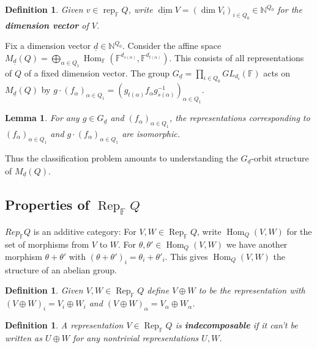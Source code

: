 \documentclass{book}
\newtheorem{lemma}[theorem]{Lemma}
\newtheorem{definition}[theorem]{Definition}
\DeclareMathOperator{\Hom}{Hom}
\DeclareMathOperator{\Rep}{Rep}
\DeclareMathOperator{\rep}{rep}
\begin{document}
	\begin{definition}
		Given $v\in \rep_\mathbb{F}Q$, write $\underline{\dim} V = (\dim V_i)_{i\in Q_0}\in \mathbb{N}^{Q_0}$ for the \textbf{dimension vector} of $V$.
	\end{definition}
	
	Fix a dimension vector $\underline{d} \in \mathbb{N}^{Q_0}$. Consider the affine space $M_{\underline{d}}(Q)=\bigoplus_{\alpha\in Q_1} \Hom_{\mathbb{F}}\left(\mathbb{F}^{d_{s(\alpha)}},\mathbb{F}^{d_{t(\alpha)}}\right)$. This consists of all representations of $Q$ of a fixed dimension vector. The group $G_{\underline{d}}= \prod_{i\in Q_0} GL_{d_i}(\mathbb{F})$ acts on $M_{\underline{d}}(Q)$ by $g\cdot (f_\alpha)_{\alpha\in Q_1}=\left(g_{t(\alpha)}f_\alpha g_{s(\alpha)}^{-1}\right)_{\alpha\in Q_1}.$
	
	\begin{lemma}
		For any $g\in G_{\underline{d}}$ and $(f_\alpha)_{\alpha\in Q_1}$, the representations corresponding to $(f_\alpha)_{\alpha\in Q_1}$ and  $g\cdot (f_\alpha)_{\alpha\in Q_1}$ are isomorphic.
	\end{lemma}
	
	Thus the classification problem amounts to understanding the $G_{\underline{d}}$-orbit structure of $M_{\underline{d}}(Q)$.
	
	\subsection{Properties of $\Rep_\mathbb{F}Q$}
		$Rep_\mathbb{F}Q$ is an additive category: For $V,W\in \Rep_\mathbb{F}Q$, write $\Hom_Q(V,W)$ for the set of morphisms from $V$ to $W$. For $\theta,\theta' \in \Hom_Q(V,W)$ we have another morphism $\theta+\theta'$ with $(\theta+\theta')_i=\theta_i+\theta'_i$. This gives $\Hom_Q(V,W)$ the structure of an abelian group. 
		
		\begin{definition}
			Given $V,W\in \Rep_\mathbb{F}Q$ define $V\oplus W$ to be the representation with $(V\oplus W)_i=V_i\oplus W_i$ and $(V\oplus W)_\alpha = V_\alpha \oplus W_\alpha$. 
		\end{definition}
		
		\begin{definition}
			A representation $V \in \Rep_\mathbb{F}Q$ is \textbf{indecomposable} if it can't be written as $U\oplus W$ for any nontrivial representations $U,W$.
		\end{definition}
		
\end{document}
